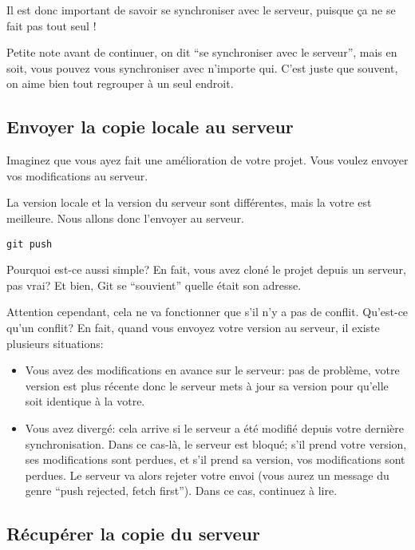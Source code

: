 \documentclass[10pt,a4paper]{article}
\begin{document}
Il est donc important de savoir se synchroniser avec le serveur, puisque ça ne se fait pas tout seul !

Petite note avant de continuer, on dit ``se synchroniser avec le serveur'', mais en soit, vous pouvez vous synchroniser avec n'importe qui. C'est juste que souvent, on aime bien tout regrouper à un seul endroit.

\subsection{Envoyer la copie locale au serveur}

Imaginez que vous ayez fait une amélioration de votre projet. Vous voulez envoyer vos modifications au serveur.

La version locale et la version du serveur sont différentes, mais la votre est meilleure.
Nous allons donc l'envoyer au serveur.

\begin{verbatim}
git push
\end{verbatim}

Pourquoi est-ce aussi simple? En fait, vous avez cloné le projet depuis un serveur, pas vrai? Et bien, Git se ``souvient'' quelle était son adresse.

Attention cependant, cela ne va fonctionner que s'il n'y a pas de conflit. Qu'est-ce qu'un conflit? En fait, quand vous envoyez votre version au serveur, il existe plusieurs situations:

\begin{itemize}
\item Vous avez des modifications en avance sur le serveur: pas de problème, votre version est plus récente donc le serveur mets à jour sa version pour qu'elle soit identique à la votre.
\item Vous avez divergé: cela arrive si le serveur a été modifié depuis votre dernière synchronisation. Dans ce cas-là, le serveur est bloqué; s'il prend votre version, ses modifications sont perdues, et s'il prend sa version, vos modifications sont perdues. Le serveur va alors rejeter votre envoi (vous aurez un message du genre ``push rejected, fetch first''). Dans ce cas, continuez à lire.
\end{itemize}

\subsection{Récupérer la copie du serveur}
\end{document}

